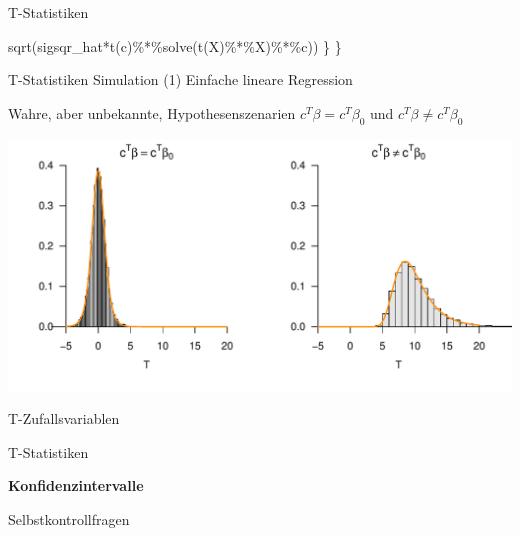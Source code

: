 \documentclass[
  8pt,
  ignorenonframetext,
]{beamer}
\newenvironment{Shaded}{\begin{snugshade}}{\end{snugshade}}
\newcommand{\FunctionTok}[1]{\textcolor[rgb]{0.00,0.00,0.00}{#1}}
\newcommand{\NormalTok}[1]{#1}
\newcommand{\SpecialCharTok}[1]{\textcolor[rgb]{0.00,0.00,0.00}{#1}}
\begin{document}
\begin{frame}[fragile]{T-Statistiken}
\begin{Shaded}
\begin{Highlighting}[]
                  \FunctionTok{sqrt}\NormalTok{(sigsqr\_hat}\SpecialCharTok{*}\FunctionTok{t}\NormalTok{(c)}\SpecialCharTok{\%*\%}\FunctionTok{solve}\NormalTok{(}\FunctionTok{t}\NormalTok{(X)}\SpecialCharTok{\%*\%}\NormalTok{X)}\SpecialCharTok{\%*\%}\NormalTok{c))}
\NormalTok{  \}}
\NormalTok{\}}
\end{Highlighting}
\end{Shaded}
\end{frame}

\begin{frame}{T-Statistiken}
\protect\hypertarget{t-statistiken-7}{}
Simulation (1) Einfache lineare Regression

\small

Wahre, aber unbekannte, Hypothesenszenarien \(c^T\beta = c^T\beta_0\)
und \(c^T\beta \neq c^T\beta_0\)

\vspace{8mm}

\begin{center}\includegraphics[width=1\linewidth]{7_Abbildungen/alm_7_T_Teststatistik_2} \end{center}
\end{frame}

\begin{frame}{}
\protect\hypertarget{section-11}{}
\vfill
\large
{}

T-Zufallsvariablen

T-Statistiken

\textbf{Konfidenzintervalle}

Selbstkontrollfragen \vfill
\end{frame}
\end{document}
